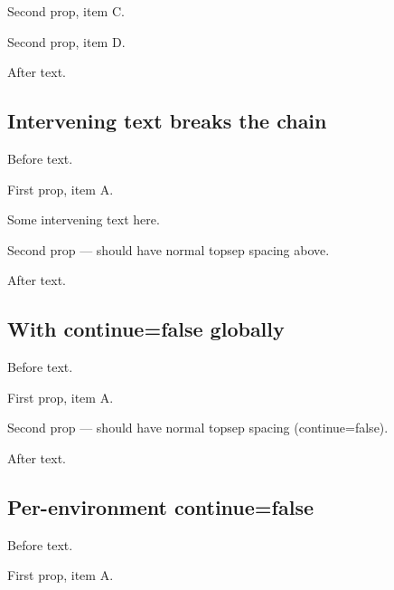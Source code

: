 \documentclass{article}
\begin{document}
\begin{prop}
  \item Second prop, item C.
  \item Second prop, item D.
\end{prop}

After text.

\subsection{Intervening text breaks the chain}

Before text.

\begin{prop}
  \item First prop, item A.
\end{prop}

Some intervening text here.

\begin{prop}
  \item Second prop — should have normal topsep spacing above.
\end{prop}

After text.

\subsection{With continue=false globally}


Before text.

\begin{prop}
  \item First prop, item A.
\end{prop}

\begin{prop}
  \item Second prop — should have normal topsep spacing (continue=false).
\end{prop}

After text.


\subsection{Per-environment continue=false}

Before text.

\begin{prop}
  \item First prop, item A.
\end{prop}
\end{document}
